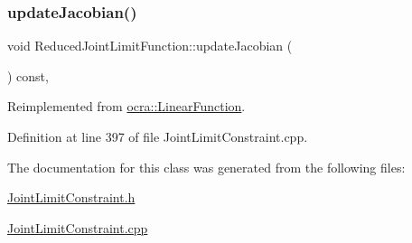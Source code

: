 \hypertarget{classocra_1_1ReducedJointLimitFunction_a3b2b65be504eda131ad8d00304304fd3}{}\label{classocra_1_1ReducedJointLimitFunction_a3b2b65be504eda131ad8d00304304fd3} 
\subsubsection{\texorpdfstring{update\+Jacobian()}{updateJacobian()}}
{\footnotesize\ttfamily void Reduced\+Joint\+Limit\+Function\+::update\+Jacobian (\begin{DoxyParamCaption}{ }\end{DoxyParamCaption}) const\hspace{0.3cm}{\ttfamily [protected]}, {\ttfamily [virtual]}}



Reimplemented from \hyperlink{classocra_1_1LinearFunction_a30926f977c0124a0b0f65b854ab39636}{ocra\+::\+Linear\+Function}.



Definition at line 397 of file Joint\+Limit\+Constraint.\+cpp.



The documentation for this class was generated from the following files\+:\begin{DoxyCompactItemize}
\item 
\hyperlink{JointLimitConstraint_8h}{Joint\+Limit\+Constraint.\+h}\item 
\hyperlink{JointLimitConstraint_8cpp}{Joint\+Limit\+Constraint.\+cpp}\end{DoxyCompactItemize}
